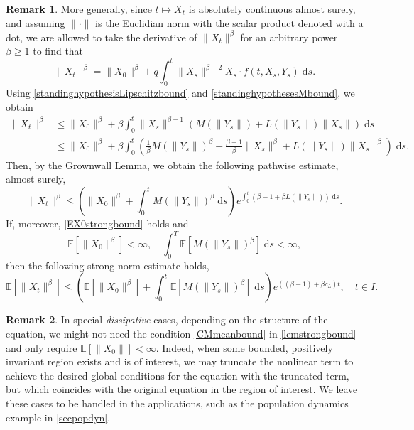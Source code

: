 \documentclass[reqno,12pt]{amsart}
\theoremstyle{plain} %
\theoremstyle{definition} %
\newtheorem{remark}{Remark}[section]
\begin{document}
\begin{remark}
    More generally, since $t\mapsto X_t$ is absolutely continuous almost surely, and assuming $\|\cdot\|$ is the Euclidian norm with the scalar product denoted with a dot, we are allowed to take the derivative of $\|X_t\|^\beta$ for an arbitrary power $\beta \geq 1$ to find that
    \[
        \|X_t\|^\beta = \|X_0\|^\beta + q\int_0^t \|X_s\|^{\beta-2}X_s \cdot f(t, X_s, Y_s)\;\mathrm{d}s.
    \]
    Using \eqref{standinghypothesisLipschitzbound} and \eqref{standinghypothesesMbound}, we obtain
    \begin{align*}
        \|X_t\|^\beta & \leq \|X_0\|^\beta + \beta\int_0^t \|X_s\|^{\beta-1} \left(M(\|Y_s\|) + L(\|Y_s\|) \|X_s\|\right)\;\mathrm{d}s \\
        & \leq \|X_0\|^\beta + \beta\int_0^t \left(\frac{1}{\beta}M(\|Y_s\|)^\beta + \frac{\beta-1}{\beta}\|X_s\|^\beta + L(\|Y_s\|) \|X_s\|^\beta\right)\;\mathrm{d}s.
    \end{align*}
    Then, by the Grownwall Lemma, we obtain the following pathwise estimate, almost surely,
    \begin{equation}
        \label{XtboundLXMtbeta}
        \|X_t\|^\beta \leq \left(\|X_0\|^\beta + \int_0^t M(\|Y_s\|)^\beta \;\mathrm{d}s\right) e^{\int_0^t \left(\beta - 1 + \beta L(\|Y_s\|)\right) \;\mathrm{d}s}.
    \end{equation}
    If, moreover, \eqref{EX0strongbound} holds and 
    \begin{equation}
        \label{EX0Mtstrongboundbeta}
        \mathbb{E}[\|X_0\|^\beta] < \infty, \quad
        \int_0^T \mathbb{E}[M(\|Y_s\|)^\beta] \;\mathrm{d}s < \infty,
    \end{equation}
    then the following strong norm estimate holds,
    \begin{equation}
        \label{EXtstrongboundbeta}
        \mathbb{E}[\|X_t\|^\beta] \leq \left(\mathbb{E}[\|X_0\|^\beta] + \int_0^t \mathbb{E}[M(\|Y_s\|)^\beta]\;\mathrm{d}s\right) e^{((\beta - 1) + \beta c_L) t}, \quad t\in I.
    \end{equation}
\end{remark}

\begin{remark}
    In special \emph{dissipative} cases, depending on the structure of the equation, we might not need the condition \eqref{CMmeanbound} in \cref{lemstrongbound} and only require $\mathbb{E}[\|X_0\|] < \infty$. Indeed, when some bounded, positively invariant region exists and is of interest, we may truncate the nonlinear term to achieve the desired global conditions for the equation with the truncated term, but which coincides with the original equation in the region of interest. We leave these cases to be handled in the applications, such as the population dynamics example in \cref{secpopdyn}.
\end{remark}
\end{document}
